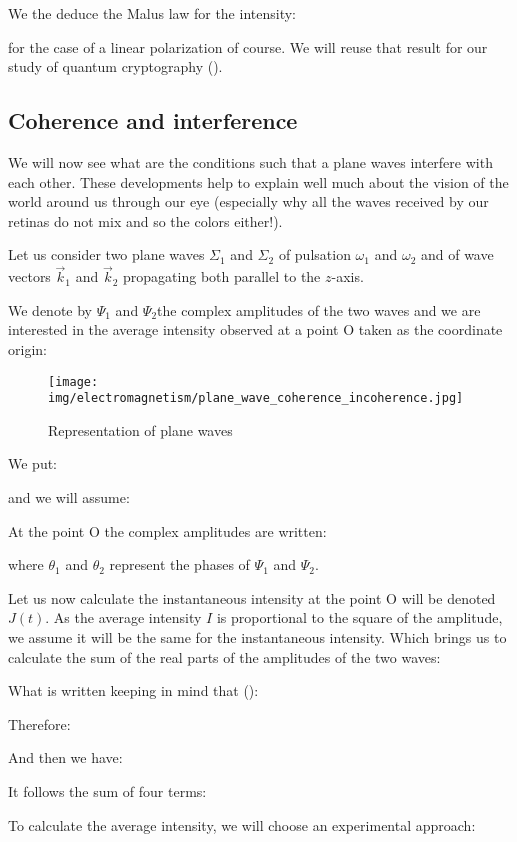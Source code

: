 	We the deduce the Malus law for the intensity\label{malus law}:
	
	for the case of a linear polarization of course. We will reuse that result for our study of quantum cryptography ().
	
	
	\subsection{Coherence and interference}
	We will now see what are the conditions such that a plane waves interfere with each other. These developments help to explain  well much about the vision of the world around us through our eye (especially why all the waves received by our retinas do not mix and so the colors either!).

	Let us consider two plane waves $\Sigma_1$ and $\Sigma_2$ of pulsation $\omega_1$ and $\omega_2$ and of wave vectors $\vec{k}_1$ and $\vec{k}_2$ propagating both parallel to the $z$-axis.

	We denote by $\Psi_1$ and $\Psi_2$the complex amplitudes of the two waves and we are interested in the average intensity observed at a point O taken as the coordinate origin:
	\begin{figure}[H]
		\centering
		\texttt{[image: img/electromagnetism/plane\_wave\_coherence\_incoherence.jpg]}
		\caption{Representation of plane waves}
	\end{figure}
	We put:
	
	and we will assume:
	
	At the point O the complex amplitudes are written:
	
	where $\theta_1$ and $\theta_2$ represent the phases of $\Psi_1$ and $\Psi_2$.
	
	Let us now calculate the instantaneous intensity at the point O will be denoted $J(t)$. As the average intensity $I$ is proportional to the square of the amplitude, we assume it will be the same for the instantaneous intensity. Which brings us to calculate the sum of the real parts of the amplitudes of the two waves:
	
	What is written keeping in mind that ():
	
	Therefore:
	
	And then we have:
	
	It follows the sum of four terms:
	
	To calculate the average intensity, we will choose an experimental approach:

